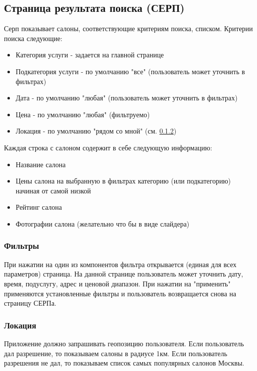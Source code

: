 \documentclass[DIV=calc, paper=a4, fontsize=11pt]{scrartcl} %
\begin{document}
\subsection{Страница результата поиска (СЕРП)}
Серп показывает салоны, соответствующие критериям поиска, списком. Критерии поиска следующие:

\begin{itemize}
	\item Категория услуги - задается на главной странице
	\item Подкатегория услуги - по умолчанию "все" (пользователь может уточнить в фильтрах)
	\item Дата - по умолчанию "любая" (пользователь может уточнить в фильтрах)
	\item Цена - по умолчанию "любая" (фильтруемо)
	\item Локация - по умолчанию "рядом со мной" (см. \ref{subsubsec:location})
\end{itemize}

Каждая строка с салоном содержит в себе следующую информацию:

\begin{itemize}
	\item Название салона
	\item Цены салона на выбранную в фильтрах категорию (или подкатегорию) начиная от самой низкой
	\item Рейтинг салона
	\item Фотографии салона (желательно что бы в виде слайдера)
\end{itemize}

\subsubsection{Фильтры}
При нажатии на один из компонентов фильтра открывается (единая для всех параметров) страница. На данной странице пользователь может уточнить дату, время, подуслугу, адрес и ценовой диапазон. При нажатии на "применить" применяются установленные фильтры и пользователь возвращается снова на страницу СЕРПа.

\subsubsection{Локация} \label{subsubsec:location}
Приложение должно запрашивать геопозицию пользователя. Если пользователь дал разрешение, то показываем салоны в радиусе 1км. Если пользователь разрешения не дал, то показываем список самых популярных салонов Москвы.
\end{document}

